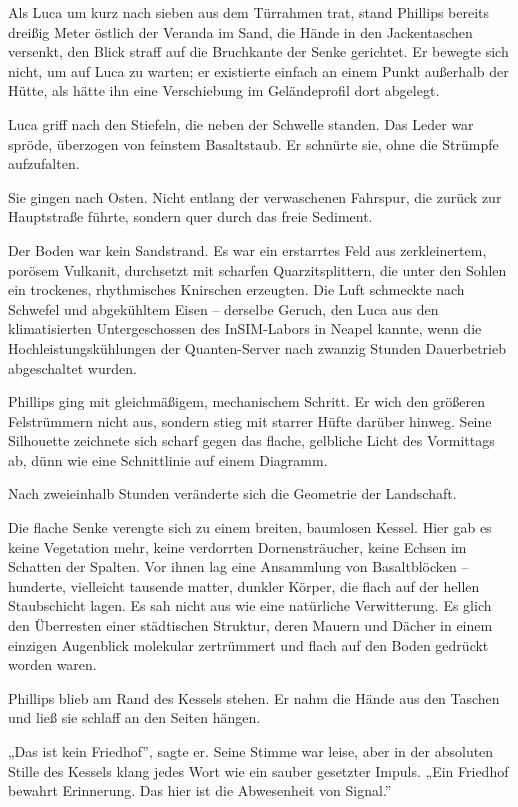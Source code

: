\documentclass[
  ngerman,
]{article}
\begin{document}
Als Luca um kurz nach sieben aus dem Türrahmen trat, stand Phillips
bereits dreißig Meter östlich der Veranda im Sand, die Hände in den
Jackentaschen versenkt, den Blick straff auf die Bruchkante der Senke
gerichtet. Er bewegte sich nicht, um auf Luca zu warten; er existierte
einfach an einem Punkt außerhalb der Hütte, als hätte ihn eine
Verschiebung im Geländeprofil dort abgelegt.

Luca griff nach den Stiefeln, die neben der Schwelle standen. Das Leder
war spröde, überzogen von feinstem Basaltstaub. Er schnürte sie, ohne
die Strümpfe aufzufalten.

Sie gingen nach Osten. Nicht entlang der verwaschenen Fahrspur, die
zurück zur Hauptstraße führte, sondern quer durch das freie Sediment.

Der Boden war kein Sandstrand. Es war ein erstarrtes Feld aus
zerkleinertem, porösem Vulkanit, durchsetzt mit scharfen
Quarzitsplittern, die unter den Sohlen ein trockenes, rhythmisches
Knirschen erzeugten. Die Luft schmeckte nach Schwefel und abgekühltem
Eisen -- derselbe Geruch, den Luca aus den klimatisierten
Untergeschossen des InSIM-Labors in Neapel kannte, wenn die
Hochleistungskühlungen der Quanten-Server nach zwanzig Stunden
Dauerbetrieb abgeschaltet wurden.

Phillips ging mit gleichmäßigem, mechanischem Schritt. Er wich den
größeren Felstrümmern nicht aus, sondern stieg mit starrer Hüfte darüber
hinweg. Seine Silhouette zeichnete sich scharf gegen das flache,
gelbliche Licht des Vormittags ab, dünn wie eine Schnittlinie auf einem
Diagramm.

Nach zweieinhalb Stunden veränderte sich die Geometrie der Landschaft.

Die flache Senke verengte sich zu einem breiten, baumlosen Kessel. Hier
gab es keine Vegetation mehr, keine verdorrten Dornensträucher, keine
Echsen im Schatten der Spalten. Vor ihnen lag eine Ansammlung von
Basaltblöcken -- hunderte, vielleicht tausende matter, dunkler Körper,
die flach auf der hellen Staubschicht lagen. Es sah nicht aus wie eine
natürliche Verwitterung. Es glich den Überresten einer städtischen
Struktur, deren Mauern und Dächer in einem einzigen Augenblick molekular
zertrümmert und flach auf den Boden gedrückt worden waren.

Phillips blieb am Rand des Kessels stehen. Er nahm die Hände aus den
Taschen und ließ sie schlaff an den Seiten hängen.

„Das ist kein Friedhof'', sagte er. Seine Stimme war leise, aber in der
absoluten Stille des Kessels klang jedes Wort wie ein sauber gesetzter
Impuls. „Ein Friedhof bewahrt Erinnerung. Das hier ist die Abwesenheit
von Signal.''
\end{document}
